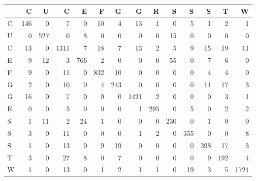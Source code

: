 \begin{tabular}{lrrrrrrrrrrrrr}
\toprule
{} &    C &    U &     C &    E &    F &    G &     G &    R &    S &    S &    S &    T &     W \\
\midrule
C &  146 &    0 &     7 &    0 &   10 &    4 &    13 &    1 &    0 &    5 &    1 &    2 &     1 \\
U &    0 &  527 &     0 &    8 &    0 &    0 &     0 &    0 &   15 &    0 &    0 &    0 &     0 \\
C &   13 &    0 &  1311 &    7 &   18 &    7 &    13 &    2 &    5 &    9 &   15 &   19 &    11 \\
E &    9 &   12 &     3 &  766 &    2 &    0 &     0 &    0 &   55 &    0 &    7 &    6 &     0 \\
F &    9 &    0 &    11 &    0 &  832 &   10 &     0 &    0 &    0 &    0 &    4 &    4 &     0 \\
G &    2 &    0 &    10 &    0 &    4 &  243 &     0 &    0 &    0 &    0 &   11 &   17 &     3 \\
G &   16 &    0 &     7 &    0 &    0 &    0 &  1421 &    2 &    0 &    0 &    0 &    3 &     1 \\
R &    0 &    0 &     5 &    0 &    0 &    0 &     1 &  295 &    0 &    5 &    0 &    2 &     2 \\
S &    1 &   11 &     2 &   24 &    1 &    0 &     0 &    0 &  230 &    0 &    1 &    0 &     0 \\
S &    3 &    0 &    11 &    0 &    0 &    0 &     1 &    2 &    0 &  355 &    0 &    0 &     8 \\
S &    1 &    0 &    13 &    0 &    9 &   19 &     0 &    0 &    0 &    0 &  398 &   17 &     3 \\
T &    3 &    0 &    27 &    8 &    0 &    7 &     0 &    0 &    0 &    0 &    9 &  192 &     4 \\
W &    1 &    0 &    13 &    0 &    1 &    2 &     1 &    1 &    0 &   19 &    3 &    5 &  1724 \\
\bottomrule
\end{tabular}
